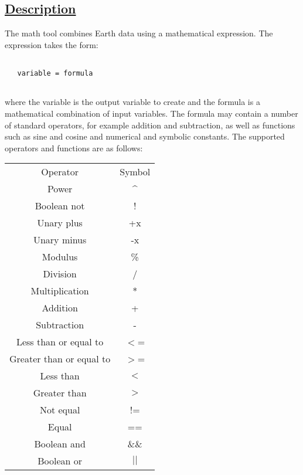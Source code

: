 \subsection*{\underline{Description}}


  The math tool combines Earth data using a mathematical expression. The expression takes the form:
\begin{verbatim}

   variable = formula
 
\end{verbatim}


 where the variable is the output variable to create and the formula is a mathematical combination of input variables. The formula may contain a number of standard operators, for example addition and subtraction, as well as functions such as sine and cosine and numerical and symbolic constants. The supported operators and functions are as follows:


\begin{tabular}{|c|c|}
\hline 
 & \\
 \hline 
Operator &Symbol \\
 \hline 
Power &\^{} \\
 \hline 
Boolean not &! \\
 \hline 
Unary plus &+x \\
 \hline 
Unary minus &-x \\
 \hline 
Modulus &\% \\
 \hline 
Division &/ \\
 \hline 
Multiplication &* \\
 \hline 
Addition &+ \\
 \hline 
Subtraction &- \\
 \hline 
Less than or equal to &$<$= \\
 \hline 
Greater than or equal to &$>$= \\
 \hline 
Less than &$<$ \\
 \hline 
Greater than &$>$ \\
 \hline 
Not equal &!= \\
 \hline 
Equal &== \\
 \hline 
Boolean and &\&\& \\
 \hline 
Boolean or &$|$$|$ \\
 \hline 

\end{tabular}



